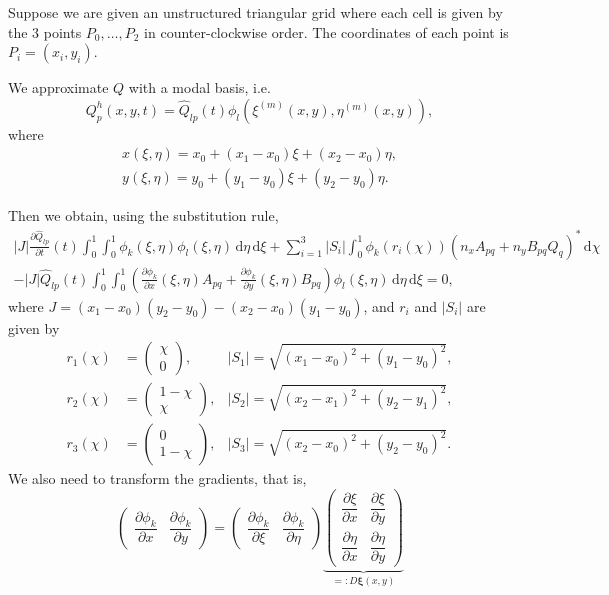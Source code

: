 \documentclass[a4paper]{scrartcl}
\newcommand{\dd}[1]{\,\mathrm{d}#1}
\begin{document}
Suppose we are given an unstructured triangular grid where each cell is given by the 3 points
$P_0,\dots,P_2$ in counter-clockwise order. The coordinates of each point is $P_i = (x_i,y_i)$.

We approximate $Q$ with a modal basis, i.e.
\begin{equation}
 Q_p^h(x,y,t) = \hat{Q}_{lp}\left(t\right)\phi_l\left(\xi^{(m)}(x,y), \eta^{(m)}(x,y)\right),
\end{equation}
where
\begin{align}
 x(\xi,\eta) = x_0 + (x_1-x_0)\xi + (x_2-x_0)\eta, \\
 y(\xi,\eta) = y_0 + (y_1-y_0)\xi + (y_2-y_0)\eta.
\end{align}

Then we obtain, using the substitution rule,
\begin{multline}
 |J|\frac{\partial \hat{Q}_{lp}}{\partial t}(t)\int_{0}^{1}\int_{0}^{1}\phi_k(\xi,\eta)\phi_l(\xi,\eta)\dd{\eta}\dd{\xi}
 + \sum_{i=1}^3 |S_i|\int_0^1\phi_k(r_i(\chi))(n_xA_{pq}+n_yB_{pq}Q_q)^*\dd{\chi} \\
 - |J|\hat{Q}_{lp}(t)\int_{0}^{1}\int_{0}^{1}\left(\frac{\partial \phi_k}{\partial x}(\xi,\eta)A_{pq}
 + \frac{\partial \phi_k}{\partial y}(\xi,\eta)B_{pq}\right)\phi_l(\xi,\eta)\dd{\eta}\dd{\xi} = 0,
\end{multline}
where $J=(x_1-x_0)(y_2-y_0)-(x_2-x_0)(y_1-y_0)$, and $r_i$ and $|S_i|$ are given by
\begin{align}
 r_1(\chi) &= \begin{pmatrix}\chi \\ 0\end{pmatrix}, & |S_1| = \sqrt{(x_1-x_0)^2 + (y_1-y_0)^2}, \\
 r_2(\chi) &= \begin{pmatrix}1-\chi \\ \chi\end{pmatrix}, & |S_2| = \sqrt{(x_2-x_1)^2 + (y_2-y_1)^2}, \\
 r_3(\chi) &= \begin{pmatrix}0 \\ 1-\chi\end{pmatrix}, & |S_3| = \sqrt{(x_2-x_0)^2 + (y_2-y_0)^2}.
\end{align}
We also need to transform the gradients, that is,
\begin{equation}
 \begin{pmatrix}
  \dfrac{\partial\phi_k}{\partial x} & \dfrac{\partial\phi_k}{\partial y}
 \end{pmatrix} =
 \begin{pmatrix}
  \dfrac{\partial\phi_k}{\partial\xi} & \dfrac{\partial\phi_k}{\partial\eta}
 \end{pmatrix}
 \underbrace{
 \begin{pmatrix}
  \dfrac{\partial\xi}{\partial x} & \dfrac{\partial\xi}{\partial y} \\
  \dfrac{\partial\eta}{\partial x} & \dfrac{\partial\eta}{\partial y}
 \end{pmatrix}}_{=:D\boldsymbol{\xi}(x,y)}
\end{equation}
\end{document}
